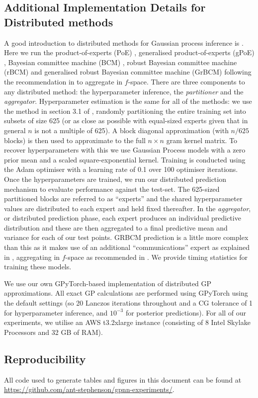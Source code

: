 \subsection{Additional Implementation Details for Distributed methods}
 A good introduction to distributed methods for Gaussian process inference is \cite{deisenroth2015distributed}. Here we run the product-of-experts (PoE) \cite{hinton2002training}, generalised product-of-experts (gPoE) \cite{cao2014generalized}, Bayesian committee machine (BCM) \cite{tresp2000bayesian}, robust Bayesian committee machine (rBCM) \cite{deisenroth2015distributed} and generalised robust Bayesian committee machine (GrBCM) \cite{amalg_SOD} following the recommendation in \cite{Cohen20b} to aggregate in $f$-space.
 There are three components to any distributed method: the hyperparameter inference, the \emph{partitioner} and the \emph{aggregator}.
Hyperparameter estimation is the same for all of the methods: we use the method in section 3.1 of \cite{deisenroth2015distributed}, randomly partitioning the entire training set into subsets of size 625 (or as close as possible with equal-sized experts given that in general $n$ is not a multiple of 625). A block diagonal approximation (with $n/625$ blocks) is then used to approximate to the full $n \times n$ gram kernel matrix. To recover hyperparameters with this we use Gaussian Process models with a zero prior mean and a scaled square-exponential kernel. Training is conducted using the Adam optimiser with a learning rate of 0.1 over 100 optimiser iterations. Once the hyperparameters are trained, we run our distributed prediction mechanism to evaluate performance against the test-set. The 625-sized partitioned blocks are referred to as ``experts'' and the shared hyperparameter values are distributed to each expert and held fixed thereafter. In the \emph{aggregator}, or distributed prediction phase, each expert produces an individual predictive distribution and these are then aggregated to a final predictive mean and variance for each of our test points. GRBCM prediction is a little more complex than this as it makes use of an additional ``communications'' expert as explained in \cite{amalg_SOD}, aggregating in $f$-space as recommended in \cite{Cohen20b}. We provide timing statistics for training these models.

We use our own GPyTorch-based implementation of distributed GP approximations.
All exact GP calculations are performed using GPyTorch using the default settings (so 20 Lanczos iterations throughout and a CG tolerance of 1 for hyperparameter inference, and $10^{-3}$ for posterior predictions).
For all of our experiments, we utilise an AWS t3.2xlarge instance (consisting of 8 Intel Skylake Processors and 32 GB of RAM).

\subsection{Reproducibility}
All code used to generate tables and figures in this document can be found at \url{https://github.com/ant-stephenson/gpnn-experiments/}.



